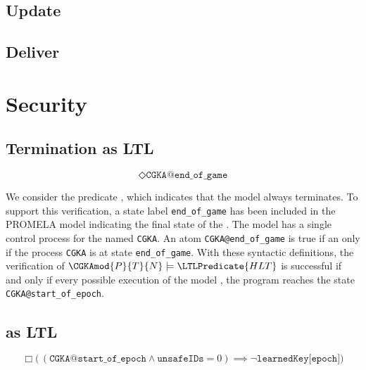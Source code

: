 \hypertarget{update}{%
\subsection{Update}\label{update}}


\hypertarget{deliver}{%
\subsection{Deliver}\label{deliver}}


\hypertarget{sec:LTL-security}{%
\section{Security}\label{sec:LTL-security}}


\hypertarget{hlt-as-ltl}{%
\subsection{Termination as LTL}\label{hlt-as-ltl}}

\begin{LTL}
    $$
    \Diamond \texttt{CGKA@end\_of\_game}
    $$
\end{LTL}

We consider the  predicate , which indicates that the  model always terminates.
To support this verification, a state label \texttt{end\_of\_game} has been included in the PROMELA model indicating the final state of the \CGKAsec. 
The model has a single control process for the \CGKAsec named \texttt{CGKA}.
An  atom \texttt{CGKA@end\_of\_game} is true if an only if the process \texttt{CGKA} is at state \texttt{end\_of\_game}.
With these syntactic definitions, the verification of \(\CGKAmod{P}{T}{N} \models \LTLPredicate{HLT} \) is successful if and only if every possible execution of the model \CGKAmod{}{}{}, the program reaches the state \texttt{CGKA@start\_of\_epoch}.


\hypertarget{pcs-as-ltl}{%
\subsection{ as LTL}\label{pcs-as-ltl}}

\begin{LTL}
    $$
    \Box \Big(\, ( \texttt{CGKA@start\_of\_epoch} \land \texttt{unsafeIDs} = 0 ) \implies \neg \texttt{learnedKey[epoch]} \Big)
    $$
\end{LTL}


